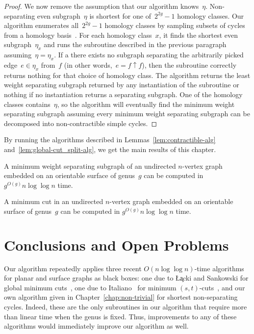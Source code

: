 \begin{proof}
We now remove the assumption that our algorithm knows~$\eta$. Non-separating even subgraph~$\eta$ is shortest for one of~$2^{2g}-1$ homology classes. Our algorithm enumerates all~$2^{2g}-1$ homology classes by sampling subsets of cycles from a homology basis~\cite{e-dgteg-03}. For each homology class~$x$, it finds the shortest even subgraph~$\eta_x$ and runs the subroutine described in the previous paragraph assuming~$\eta = \eta_x$. If a there exists no subgraph separating the arbitrarily picked edge~$e \in \eta_x$ from~$f$ (in other words,~$e = f \uparrow f$), then the subroutine correctly returns nothing for that choice of homology class.
The algorithm returns the least weight separating subgraph returned by any instantiation of the subroutine or nothing if no instantiation returns a separating subgraph.
One of the homology classes contains~$\eta$, so the algorithm will eventually find the minimum weight separating subgraph assuming every minimum weight separating subgraph can be decomposed into non-contractible simple cycles.
\end{proof}

By running the algorithms described in Lemmas~\ref{lem:contractible-alg} and~\ref{lem:global-cut_split-alg}, we get the main results of this chapter.

\begin{theorem}
  A minimum weight separating subgraph of an undirected $n$-vertex
  graph embedded on an orientable surface of genus~$g$ can be computed
  in $g^{O(g)} n \log \log n$ time.
\end{theorem}

\begin{corollary}
  A minimum cut in an undirected $n$-vertex graph embedded on
  an orientable surface of genus~$g$ can be computed in 
  $g^{O(g)} n \log \log n$ time.
\end{corollary}

\section{Conclusions and Open Problems}
\label{sec:global-cut_conclusions}

Our algorithm repeatedly applies three recent $O(n\log\log n)$-time algorithms for planar and surface graphs as black boxes: one due to \L\c{a}cki and Sankowski for global minimum cuts~\cite{ls-mcsc-11}, one due to  Italiano \etal~for minimum $(s,t)$-cuts~\cite{insw-iamcmf-11}, and our own algorithm given in Chapter~\ref{chap:non-trivial} for shortest non-separating cycles. Indeed, these are the only subroutines in our algorithm that require more than linear time when the genus is fixed.  Thus, improvements to any of these algorithms would immediately improve our algorithm as well.

